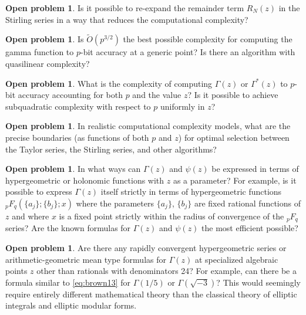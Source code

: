 \documentclass[reqno]{amsart}
\newcommand{\bigOtilde}{\widetilde O}
\theoremstyle{definition}
\newtheorem{problem}[theorem]{Open problem}
\begin{document}
\begin{problem}
Is it possible to re-expand the remainder term $R_N(z)$ in the Stirling series
in a way that reduces the computational complexity?
\end{problem}

\begin{problem}
Is $\bigOtilde(p^{3/2})$ the best possible complexity
for computing the gamma function to $p$-bit
accuracy at a generic point? Is there an algorithm with
quasilinear complexity?
\end{problem}

\begin{problem}
What is the complexity of computing $\Gamma(z)$ or $\Gamma^{*}(z)$ to $p$-bit accuracy accounting
for both $p$ and the value $z$? Is it possible to achieve subquadratic
complexity with respect to $p$ uniformly in $z$?
\end{problem}

\begin{problem}
In realistic computational complexity models,
what are the precise boundaries (as functions of both $p$ and $z$)
for optimal selection between the Taylor series,
the Stirling series, and other algorithms?
\end{problem}

\begin{problem}
In what ways can $\Gamma(z)$ and $\psi(z)$ be expressed
in terms of hypergeometric or holonomic functions with $z$ as a parameter?
For example, is it possible to express $\Gamma(z)$ itself
strictly in terms of hypergeometric functions ${}_{p}F_q(\{a_j\};\{b_j\};x)$
where the parameters $\{a_j\}$, $\{b_j\}$ are fixed rational functions of $z$
and where $x$ is a fixed point strictly within the radius of convergence of the ${}_{p}F_q$ series?
Are the known formulas for $\Gamma(z)$ and $\psi(z)$ the most efficient possible?
\end{problem}

\begin{problem}
Are there any rapidly convergent hypergeometric series
or arithmetic-geometric mean type formulas for $\Gamma(z)$
at specialized algebraic points $z$ other than rationals with denominators 24?
For example, can there be a formula similar to \eqref{eq:brown13} for $\Gamma(1/5)$ or $\Gamma(\sqrt{-3})$?
This would seemingly require entirely different mathematical
theory than the classical theory of elliptic integrals and elliptic modular forms.
\end{problem}
\end{document}
